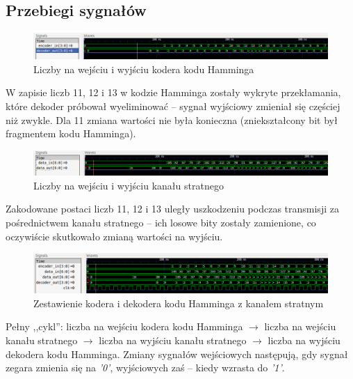 \documentclass[a4paper,11pt]{article}
\begin{document}
  \subsection{Przebiegi sygnałów}
  \begin{figure}[H]
    \includegraphics[width=1.2\textwidth,center]{gtk1.png}
    \caption{Liczby na wejściu i wyjściu kodera kodu Hamminga}
  \end{figure}
  W zapisie liczb 11, 12 i 13 w kodzie Hamminga zostały wykryte przekłamania, które dekoder próbował wyeliminować -- sygnał wyjściowy zmieniał się częściej niż zwykle. Dla 11 zmiana wartości nie była konieczna (zniekształcony bit był fragmentem kodu Hamminga).
  \begin{figure}[H]
    \includegraphics[width=1.2\textwidth,center]{gtk2.png}
    \caption{Liczby na wejściu i wyjściu kanału stratnego}
  \end{figure}
  Zakodowane postaci liczb 11, 12 i 13 uległy uszkodzeniu podczas transmisji za pośrednictwem kanału stratnego -- ich losowe bity zostały zamienione, co oczywiście skutkowało zmianą wartości na wyjściu.
  \begin{figure}[H]
    \includegraphics[width=1.2\textwidth,center]{gtk3.png}
    \caption{Zestawienie kodera i dekodera kodu Hamminga z kanałem stratnym}
  \end{figure}
  Pełny ,,cykl'': liczba na wejściu kodera kodu Hamminga $\rightarrow$ liczba na wejściu kanału stratnego $\rightarrow$ liczba na wyjściu kanału stratnego $\rightarrow$ liczba na wyjściu dekodera kodu Hamminga. Zmiany sygnałów wejściowych następują, gdy sygnał zegara zmienia się na \textit{'0'}, wyjściowych zaś -- kiedy wzrasta do \textit{'1'}.
\end{document}
